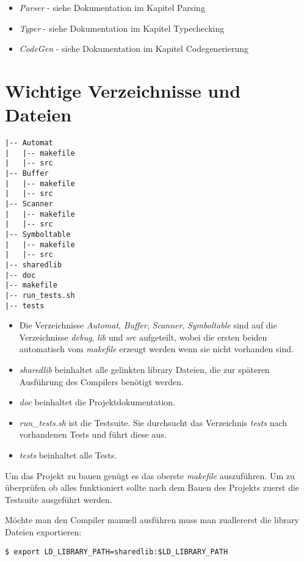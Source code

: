 \documentclass[a4paper,11pt,titlepage,openany,oneside]{scrbook}
\begin{document}
\begin{itemize}
    \item \textit{Parser} - siehe Dokumentation im Kapitel Parsing
    \item \textit{Typer} - siehe Dokumentation im Kapitel Typechecking
    \item \textit{CodeGen} - siehe Dokumentation im Kapitel Codegenerierung
\end{itemize}

\chapter{Wichtige Verzeichnisse und Dateien}

\begin{verbatim}
|-- Automat
|   |-- makefile
|   |-- src
|-- Buffer
|   |-- makefile
|   |-- src
|-- Scanner
|   |-- makefile
|   |-- src
|-- Symboltable
|   |-- makefile
|   |-- src
|-- sharedlib
|-- doc
|-- makefile
|-- run_tests.sh
|-- tests
\end{verbatim}

\begin{itemize}
  \item Die Verzeichnisse \textit{Automat}, \textit{Buffer}, \textit{Scanner}, \textit{Symboltable} sind auf die Verzeichnisse \textit{debug}, \textit{lib} und \textit{src} aufgeteilt, wobei die ersten beiden automatisch vom \textit{makefile} erzeugt werden wenn sie nicht vorhanden sind.
  \item \textit{sharedlib} beinhaltet alle gelinkten library Dateien, die zur späteren Ausführung des Compilers benötigt werden.
    \item \textit{doc} beinhaltet die Projektdokumentation.
    \item \textit{run\_tests.sh} ist die Testsuite. Sie durchsucht das Verzeichnis \textit{tests} nach vorhandenen Tests und führt diese aus.
    \item \textit{tests} beinhaltet alle Tests.
\end{itemize}

Um das Projekt zu bauen genügt es das oberste \textit{makefile} auszuführen. Um zu überprüfen ob alles funktioniert sollte nach dem Bauen des Projekts zuerst die Testsuite ausgeführt werden.

Möchte man den Compiler manuell ausführen muss man zuallererst die library Dateien exportieren:

\begin{verbatim}
$ export LD_LIBRARY_PATH=sharedlib:$LD_LIBRARY_PATH
\end{verbatim}
\end{document}
